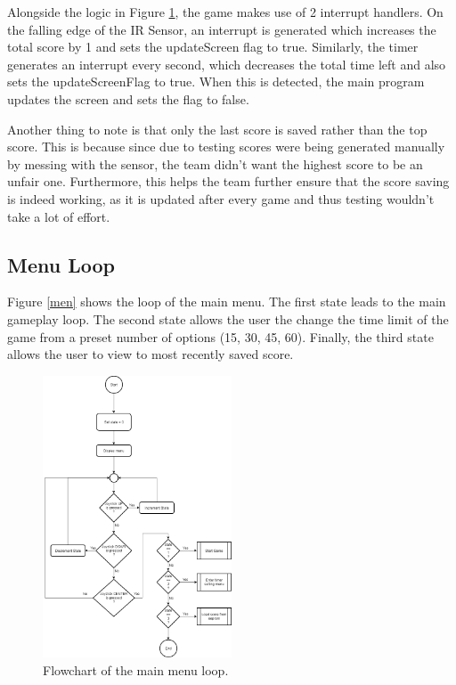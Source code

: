 \documentclass[11pt,a4paper,twocolumn]{article}
\begin{document}
Alongside the logic in Figure \ref{flow}, the game makes use of 2 interrupt handlers. On the falling edge of the IR Sensor, an interrupt is generated which increases the total score by 1 and sets the updateScreen flag to true. Similarly, the timer generates an interrupt every second, which decreases the total time left and also sets the updateScreenFlag to true. When this is detected, the main program updates the screen and sets the flag to false.


Another thing to note is that only the last score is saved rather than the top score. This is because since due to testing scores were being generated manually by messing with the sensor, the team didn't want the highest score to be an unfair one. Furthermore, this helps the team further ensure that the score saving is indeed working, as it is updated after every game and thus testing wouldn't take a lot of effort.

\subsection{Menu Loop}
Figure \ref{men} shows the loop of the main menu. The first state leads to the main gameplay loop. The second state allows the user the change the time limit of the game from a preset number of options (15, 30, 45, 60). Finally, the third state allows the user to view to most recently saved score.

\begin{figure}[!ht]
	\includegraphics[width=0.5\textwidth]{menuLoop.png}
\caption{Flowchart of the main menu loop.}\label{men}
\label{flow}
\end{figure}
\end{document}
